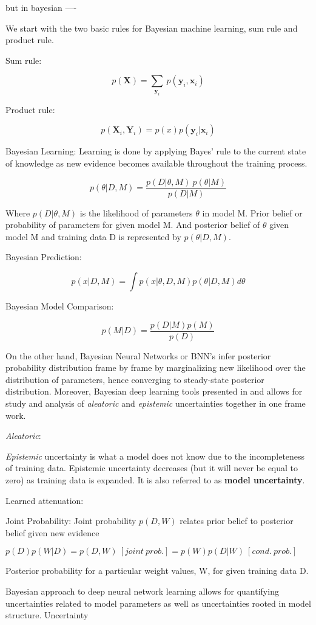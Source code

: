\documentclass[11pt]{article}
\begin{document}
\begin{itemize}
	      but in bayesian ----

	      We start with the two basic rules for Bayesian machine learning, sum rule
	      and product rule.

	      Sum rule:

	      $$ p(\textbf{X}) = \sum_{\textbf{y}_{i}}~ p(\textbf{y}_{i} ,\textbf{x}_{i})  $$

	      Product rule:

	      $$  p(\textbf{X}_{i}, \textbf{Y}_{i}) = p(x)p(\textbf{y}_{i}|\textbf{x}_{i}) $$


	      Bayesian Learning: Learning is done by applying Bayes' rule to the current
	      state of knowledge as new evidence becomes available throughout the training
	      process.

	      $$ p(\theta | D, M) = \frac{p(D|\theta,M)~p(\theta|M)}{p(D|M)}  $$

	      Where \( p(D| \theta, M) \) is the likelihood of parameters \( \theta \) in
	      model M. Prior belief or probability of parameters for given model M. And
	      posterior belief of \( \theta \) given model M and training data D is
	      represented by \( p(\theta | D, M) \).

	      Bayesian Prediction:

	      $$ p(x| D, M) = \int p(x| \theta, D, M) p(\theta| D, M) d\theta $$

	      Bayesian Model Comparison:

	      $$ p(M|D) = \frac{p(D|M)p(M)}{p(D)}$$

	      On the other hand, Bayesian Neural Networks or BNN's infer posterior
	      probability distribution frame by frame by marginalizing new likelihood
	      over the distribution of parameters, hence converging to steady-state
	      posterior distribution. Moreover, Bayesian deep learning tools presented
	      in \cite{kendall2017uncertainties} and \cite{gal2016uncertainty} allows for
	      study and analysis of \textit{aleatoric} and \textit{epistemic} uncertainties
	      together in one frame work.

	      \textit{Aleatoric}:

	      \textit{Epistemic} uncertainty is what a model does not know due to the
	      incompleteness of training data. Epistemic uncertainty decreases (but it
	      will never be equal to zero) as training data is expanded. It is also
	      referred to as \textbf{model uncertainty}.

	      Learned attenuation:

	      Joint Probability: Joint probability \(p(D,W)\) relates prior belief to
	      posterior belief given new evidence

	      \( p(D)p(W|D) = p(D,W)~[joint~prob.] = p(W)p(D|W)~[cond.~prob.]\)

	      Posterior probability for a particular weight values, W, for given training data D.

	      Bayesian approach to deep neural network learning allows for quantifying
	      uncertainties related to model parameters as well as uncertainties rooted in
	      model structure. Uncertainty


\end{itemize}
\end{document}
